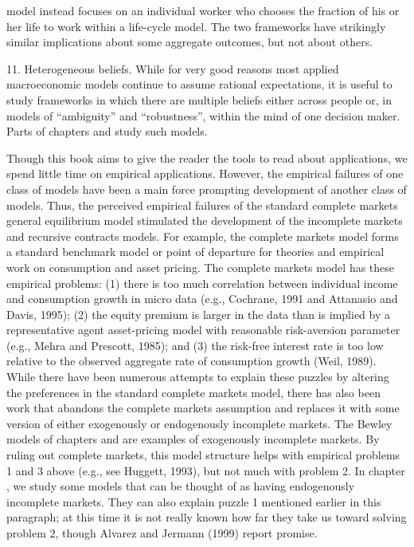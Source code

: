 model instead focuses on an individual worker who  chooses the fraction of his or her
life to work within a life-cycle model.  The two frameworks have strikingly similar
implications about some aggregate outcomes, but not about others.
\medskip
\item{11.} Heterogeneous beliefs.  While  for very good reasons most applied macroeconomic models continue to assume  rational expectations,
it is useful to study  frameworks in which there are multiple beliefs either across people or, in models of ``ambiguity'' and
``robustness'', within the mind of one decision maker.  Parts of chapters  and  study
such models.




\noindent Though this book aims to give the reader the tools
to read about applications, we spend little time
on empirical applications.
  However, the empirical failures of one class of models have been a main force
prompting development of another class of models.
Thus,  the  perceived empirical failures of the standard
complete markets general equilibrium model stimulated
the development of the incomplete markets and recursive
contracts models.   For example, the complete markets model
forms  a standard benchmark model  or point of departure
for theories and empirical work  on
consumption and asset pricing.   The complete markets model
has these empirical problems:  (1)  there is too much
correlation between individual income and consumption growth
in micro data (e.g., Cochrane, 1991 and Attanasio and Davis, 1995);
(2)  the equity premium is larger in the data than
is implied by a representative agent  asset-pricing model with reasonable
risk-aversion parameter (e.g., Mehra and Prescott, 1985); and
 (3) the risk-free interest rate is   too low relative
to the observed aggregate rate of consumption  growth (Weil, 1989).
While there have been numerous attempts to explain these puzzles
by altering the preferences in the standard complete markets
model, there has  also been work that abandons the complete
markets assumption  and replaces it with
some version of either exogenously or endogenously incomplete
markets.   The Bewley models of chapters   and
  are
examples of exogenously incomplete markets.   By ruling
out complete markets, this model structure  helps
with empirical  problems 1 and 3 above (e.g., see
Huggett, 1993), but not much with problem 2.     In chapter
, we study some models that can be thought of as
having endogenously incomplete markets.   They can also explain
puzzle 1 mentioned earlier in this paragraph;
  at this time it is not really known how far
they take us toward solving problem 2, though Alvarez and Jermann (1999)
report promise.


